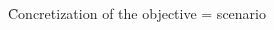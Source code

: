 \begin{frame}
\begin{columns}
\begin{column}{0.45\textwidth}
\end{column}
\end{columns}

\medskip
\begin{center}
\f Concretization of the objective = scenario

\end{center}
\end{frame}


% 
% 
% 
% 




